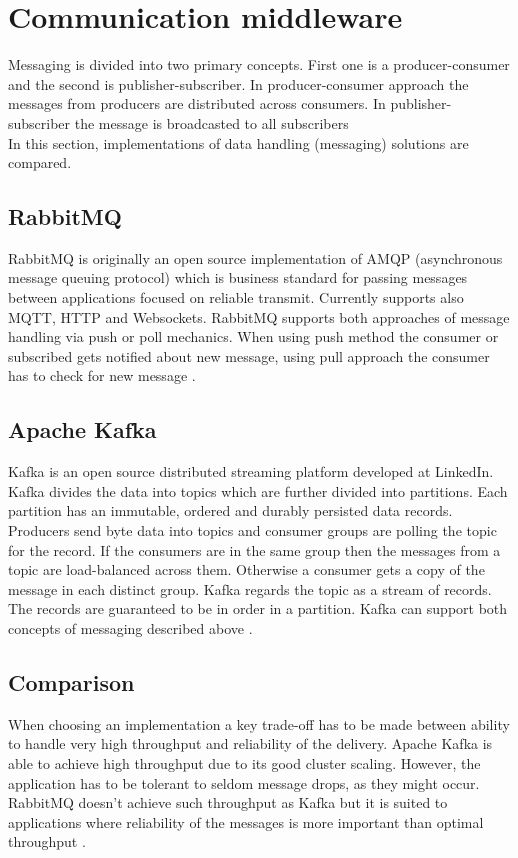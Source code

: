 \documentclass[thesis=M,english]{FITthesis}[2019/03/06]
\begin{document}
\section{Communication middleware}
Messaging is divided into two primary concepts. First one is a producer-consumer and the second is publisher-subscriber. In producer-consumer approach the messages from producers are distributed across consumers. In publisher-subscriber the message is broadcasted to all subscribers\\

In this section, implementations of data handling (messaging) solutions are compared.

\subsection{RabbitMQ}
RabbitMQ is originally an open source implementation of AMQP (asynchronous message queuing protocol) which is business standard for passing messages between applications focused on reliable transmit. Currently supports also MQTT, HTTP and Websockets. RabbitMQ supports both approaches of message handling via push or poll mechanics. When using push method the consumer or subscribed gets notified about new message, using pull approach the consumer has to check for new message \cite{cit:rabbitmq} \cite{cit:kafkavsrabbit}.
\subsection{Apache Kafka}
Kafka is an open source distributed streaming platform developed at LinkedIn. Kafka divides the data into topics which are further divided into partitions. Each partition has an immutable, ordered and durably persisted data records. Producers send byte data into topics and consumer groups are polling the topic for the record. If the consumers are in the same group then the messages from a topic are load-balanced across them. Otherwise a consumer gets a copy of the message in each distinct group. Kafka regards the topic as a stream of records. The records are guaranteed to be in order in a partition. Kafka can support both concepts of messaging described above \cite{cit:kafkavsrabbit} \cite{cit:kafka}.

\subsection{Comparison}
When choosing an implementation a key trade-off has to be made between ability to handle very high throughput and reliability of the delivery. Apache Kafka is able to achieve high throughput due to its good cluster scaling. However, the application has to be tolerant to seldom message drops, as they might occur. RabbitMQ doesn't achieve such throughput as Kafka but it is suited to applications where reliability of the messages is more important than optimal throughput \cite{cit:kafkavsrabbit}.
\end{document}
